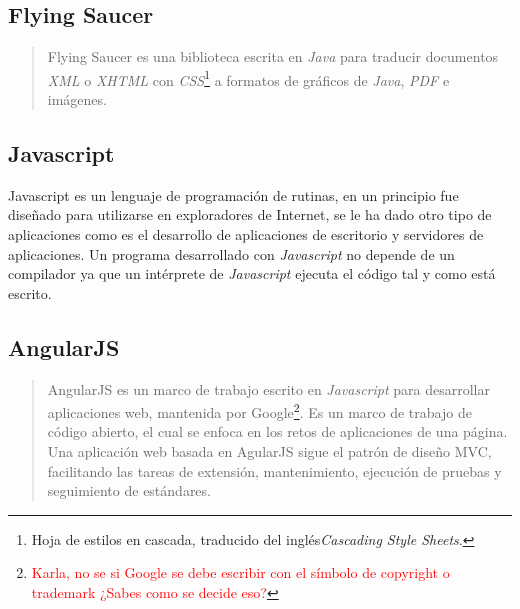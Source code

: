 \subsection{Flying Saucer}\label{sec:flying-saucer}
\begin{quote}
	Flying Saucer es una biblioteca escrita en \textit{Java} para traducir documentos \textit{XML} o \textit{XHTML} con \textit{CSS}\footnote{Hoja de estilos en cascada, traducido del inglés\textit{Cascading Style Sheets}.} a formatos de gráficos de \textit{Java}, \textit{PDF} e imágenes\cite{FlyingSaucer}.
\end{quote}

\subsection{Javascript}\label{sec:javascript}
Javascript es un lenguaje de programación de rutinas, en un principio fue diseñado para utilizarse en exploradores de Internet, se le ha dado otro tipo de aplicaciones como es el desarrollo de aplicaciones de escritorio y servidores de aplicaciones. Un programa desarrollado con \textit{Javascript} no depende de un compilador ya que un intérprete de \textit{Javascript} ejecuta el código tal y como está escrito\cite{LearningWebDesign}.

\subsection{AngularJS}\label{sec:angularjs}

\begin{quote}
	AngularJS es un marco de trabajo escrito en \textit{Javascript} para desarrollar aplicaciones web, mantenida por Google\textsuperscript{\textcopyright}\footnote{\textcolor{red}{Karla, no se si Google se debe escribir con el símbolo de copyright \textcopyright o trademark \texttrademark ¿Sabes como se decide eso?}}. Es un marco de trabajo de código abierto, el cual se enfoca en los retos de aplicaciones de una página. Una aplicación web basada en AgularJS sigue el patrón de diseño MVC, facilitando las tareas de extensión, mantenimiento, ejecución de pruebas y seguimiento de estándares\cite{FullStackAngularJS}.
\end{quote}

